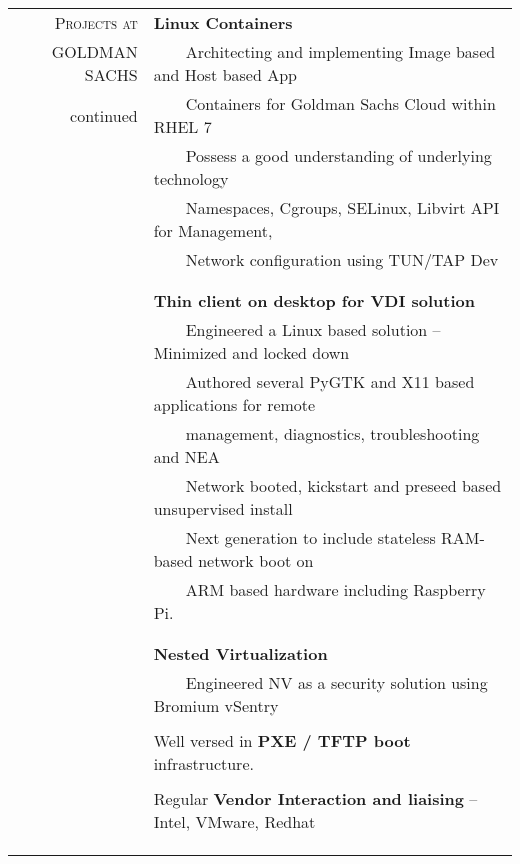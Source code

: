\documentclass[a4paper,10pt]{article} %
\newcommand{\tabitem}{~~\llap{\textbullet}~~}
\begin{document}
\begin{tabular}{rl}
\textsc{Projects at} & \textbf{Linux Containers} \\
\textsc{GOLDMAN SACHS} & \tabitem Architecting and implementing Image based and Host based App \\
continued & ~~~~Containers for Goldman Sachs Cloud within RHEL 7 \\
& \tabitem Possess a good understanding of underlying technology \\
& ~~~~Namespaces, Cgroups, SELinux, Libvirt API for Management, \\
& ~~~~Network configuration using TUN/TAP Dev\\
&\\
&\\
& \textbf{Thin client on desktop for VDI solution} \\
& \tabitem Engineered a Linux based solution – Minimized and locked down \\
& \tabitem Authored several PyGTK and X11 based applications for remote \\
& ~~~~management, diagnostics, troubleshooting and NEA \\
& \tabitem Network booted, kickstart and preseed based unsupervised install \\
& ~~~~Next generation to include stateless RAM-based network boot on\\ & ~~~~ARM based hardware including Raspberry Pi. \\
& \\
&\\
& \textbf{Nested Virtualization} \\
& \tabitem Engineered NV as a security solution using Bromium vSentry \\
& \\
& Well versed in \textbf{PXE / TFTP boot} infrastructure. \\
& \\
& Regular \textbf{Vendor Interaction and liaising} – Intel, VMware, Redhat \\
&\\
&\\
&\\
\end{tabular}
\end{document}
